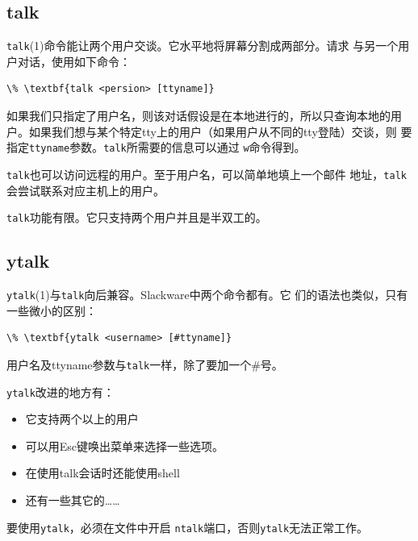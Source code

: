 \subsection{talk}
\label{chap:basicNetworkCommands:talk:talk}
\texttt{talk}(1)命令能让两个用户交谈。它水平地将屏幕分割成两部分。请求
与另一个用户对话，使用如下命令：
\begin{Verbatim}[frame=single, commandchars=\\\{\}]
\% \textbf{talk <persion> [ttyname]}
\end{Verbatim}

如果我们只指定了用户名，则该对话假设是在本地进行的，所以只查询本地的用
户。如果我们想与某个特定tty上的用户（如果用户从不同的tty登陆）交谈，则
要指定\texttt{ttyname}参数。\texttt{talk}所需要的信息可以通过
\texttt{w}命令得到。

\texttt{talk}也可以访问远程的用户。至于用户名，可以简单地填上一个邮件
地址，\texttt{talk}会尝试联系对应主机上的用户。

\texttt{talk}功能有限。它只支持两个用户并且是半双工的。

\subsection{ytalk}
\label{chap:basicNetworkCommands:talk:ytalk}
\texttt{ytalk}(1)与\texttt{talk}向后兼容。Slackware中两个命令都有。它
们的语法也类似，只有一些微小的区别：
\begin{Verbatim}[frame=single, commandchars=\\\{\}]
\% \textbf{ytalk <username> [#ttyname]}
\end{Verbatim}

用户名及ttyname参数与\texttt{talk}一样，除了要加一个\#号。

\texttt{ytalk}改进的地方有：
\begin{itemize}
\item 它支持两个以上的用户
\item 可以用Esc键唤出菜单来选择一些选项。
\item 在使用talk会话时还能使用shell
\item 还有一些其它的……
\end{itemize}
要使用\texttt{ytalk}，必须在文件中开启
\texttt{ntalk}端口，否则\texttt{ytalk}无法正常工作。


